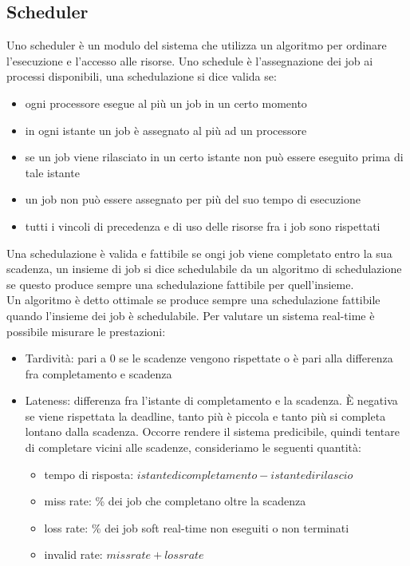 \documentclass{article}
\begin{document}
\subsection{Scheduler}
Uno scheduler è un modulo del sistema che utilizza un algoritmo per ordinare l'esecuzione e l'accesso alle risorse. Uno schedule è l'assegnazione dei job ai processi disponibili, una schedulazione si dice valida se:
\begin{itemize}
\item ogni processore esegue al più un job in un certo momento
\item in ogni istante un job è assegnato al più ad un processore
\item se un job viene rilasciato in un certo istante non può essere eseguito prima di tale istante
\item un job non può essere assegnato per più del suo tempo di esecuzione
\item tutti i vincoli di precedenza e di uso delle risorse fra i job sono rispettati
\end{itemize}
Una schedulazione è valida e fattibile se ongi job viene completato entro la sua scadenza, un insieme di job si dice schedulabile da un algoritmo di schedulazione se questo produce sempre una schedulazione fattibile per quell'insieme.\\ Un algoritmo è detto ottimale se produce sempre una schedulazione fattibile quando l'insieme dei job è schedulabile. Per valutare un sistema real-time è possibile misurare le prestazioni:
\begin{itemize}
\item Tardività: pari a 0 se le scadenze vengono rispettate o è pari alla differenza fra completamento e scadenza
\item Lateness: differenza fra l'istante di completamento e la scadenza. È negativa se viene rispettata la deadline, tanto più è piccola e tanto più si completa lontano dalla scadenza. Occorre rendere il sistema predicibile, quindi tentare di completare vicini alle scadenze, consideriamo le seguenti quantità:
\begin{itemize}
\item tempo di risposta: $istante di completamento - istante di rilascio$
\item miss rate: \% dei job che completano oltre la scadenza
\item loss rate: \% dei job soft real-time non eseguiti o non terminati
\item  invalid rate: $miss rate + loss rate$
\end{itemize}
\end{itemize}
\end{document}
